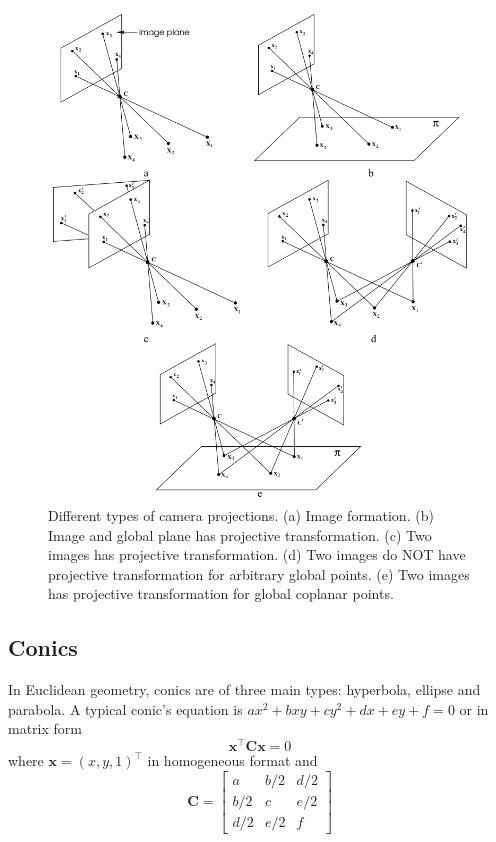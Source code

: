 \documentclass[12pt]{article}
\numberwithin{equation}{section}
\begin{document}
\begin{figure}[!]
\begin{center}
\includegraphics[width=1.0\textwidth]{all_proj.png}
\end{center}
\caption{Different types of camera projections. (a) Image formation. (b) Image and global plane has projective transformation. (c) Two images has projective transformation. (d) Two images do NOT have projective transformation for arbitrary global points. (e) Two images has projective transformation for global coplanar points.}
\label{fig:all_proj_example}
\end{figure}


\subsection{Conics}

In Euclidean geometry, conics are of three main types: hyperbola, ellipse and parabola. A typical conic's equation is $ax^2 + bxy + cy^2 + dx + ey + f = 0$ or in matrix form
\begin{equation}
\mathbf{x^\top C x} = 0
\label{eq:conic}
\end{equation}
where $\mathbf{x} = (x, y, 1)^\top$ in homogeneous format and 
\begin{equation*}
\mathbf{C} = 
\begin{bmatrix}
a & b / 2 & d / 2 \\
b / 2 & c & e / 2 \\
d / 2 & e / 2 & f
\end{bmatrix}
\end{equation*}
\end{document}
